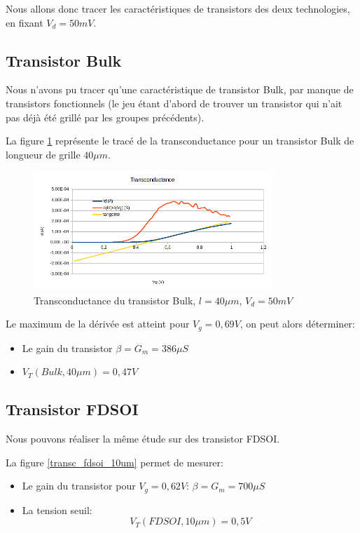 \documentclass[a4paper,11pt]{report}
\begin{document}
Nous allons donc tracer les caractéristiques de transistors des deux technologies, en fixant $V_d = 50mV$.

\subsection{Transistor Bulk}
Nous n'avons pu tracer qu'une caractéristique de transistor Bulk, par manque de transistors fonctionnels (le jeu étant d'abord de trouver un transistor qui n'ait pas déjà été grillé par les groupes précédents).

La figure \ref{transconductance bulk} représente le tracé de la transconductance pour un transistor Bulk de longueur de grille $40\mu m$.

\begin{figure}[h]
    \begin{center}
        \includegraphics[width=0.8\textwidth]{Images/Bulk40-Transconductance}
        \caption{Transconductance du transistor Bulk, $l=40\mu m$, $V_d = 50mV$}
        \label{transconductance bulk}
    \end{center}
\end{figure}

Le maximum de la dérivée est atteint pour $V_g = 0,69V$, on peut alors déterminer:
\begin{itemize}
    \item Le gain du transistor $\beta = G_m = 386\mu S$
    \item $V_T(Bulk, 40\mu m) = 0,47V$
\end{itemize}


\subsection{Transistor FDSOI}
Nous pouvons réaliser la même étude sur des transistor FDSOI.

La figure \ref{transc_fdsoi_10um} permet de mesurer:

\begin{itemize}
    \item Le gain du transistor pour $V_g = 0,62V$: $\beta = G_m = 700\mu S$
    \item La tension seuil: \[V_T(FDSOI, 10\mu m) = 0,5V\]
\end{itemize}
\end{document}
